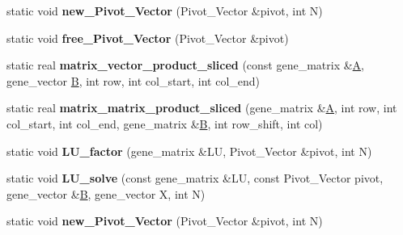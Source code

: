 \begin{DoxyCompactItemize}
\item 
\mbox{\label{classblitz___l_u__solve__interface_adafba612b512655463cd9d1fa7239d8c}} 
static void {\bfseries new\+\_\+\+Pivot\+\_\+\+Vector} (Pivot\+\_\+\+Vector \&pivot, int N)
\item 
\mbox{\label{classblitz___l_u__solve__interface_ae58840dbbcb44f84500e26d0a212b219}} 
static void {\bfseries free\+\_\+\+Pivot\+\_\+\+Vector} (Pivot\+\_\+\+Vector \&pivot)
\item 
\mbox{\label{classblitz___l_u__solve__interface_a9ffd8f9541d9559c4b0f6d0532587e76}} 
static real {\bfseries matrix\+\_\+vector\+\_\+product\+\_\+sliced} (const gene\+\_\+matrix \&\hyperlink{group___core___module_class_eigen_1_1_matrix}{A}, gene\+\_\+vector \hyperlink{group___core___module_class_eigen_1_1_matrix}{B}, int row, int col\+\_\+start, int col\+\_\+end)
\item 
\mbox{\label{classblitz___l_u__solve__interface_afebfcffc1b05ad809cc704a0aa54a26e}} 
static real {\bfseries matrix\+\_\+matrix\+\_\+product\+\_\+sliced} (gene\+\_\+matrix \&\hyperlink{group___core___module_class_eigen_1_1_matrix}{A}, int row, int col\+\_\+start, int col\+\_\+end, gene\+\_\+matrix \&\hyperlink{group___core___module_class_eigen_1_1_matrix}{B}, int row\+\_\+shift, int col)
\item 
\mbox{\label{classblitz___l_u__solve__interface_a35ac67142990402c20597bf9a8d8d9b9}} 
static void {\bfseries L\+U\+\_\+factor} (gene\+\_\+matrix \&LU, Pivot\+\_\+\+Vector \&pivot, int N)
\item 
\mbox{\label{classblitz___l_u__solve__interface_acb9e0965fe92bb88c1b6d4e2a78906be}} 
static void {\bfseries L\+U\+\_\+solve} (const gene\+\_\+matrix \&LU, const Pivot\+\_\+\+Vector pivot, gene\+\_\+vector \&\hyperlink{group___core___module_class_eigen_1_1_matrix}{B}, gene\+\_\+vector X, int N)
\item 
\mbox{\label{classblitz___l_u__solve__interface_adafba612b512655463cd9d1fa7239d8c}} 
static void {\bfseries new\+\_\+\+Pivot\+\_\+\+Vector} (Pivot\+\_\+\+Vector \&pivot, int N)

\end{DoxyCompactItemize}
